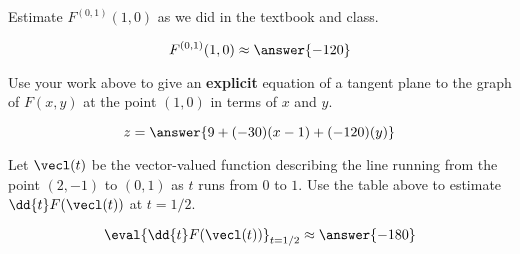 \documentclass{ximera}
\begin{document}
\begin{problem}
Estimate $F^{(0,1)}(1,0)$ as we did in the textbook and class.
\begin{prompt}
\[
  F^{(0,1)}(1,0) \approx \answer{-120}
\]
\end{prompt}

\vfill

\end{problem}


\begin{problem}
  Use your work above to give an \textbf{explicit} equation of a
  tangent plane to the graph of $F(x,y)$ at the point $(1,0)$ in terms
  of $x$ and $y$.
\begin{prompt}
\[
z = \answer{9 + (-30)(x - 1) + (-120)(y)}
\]
\end{prompt}

\vfill

\end{problem}


\begin{problem}
  Let $\vecl(t)$ be the vector-valued function describing the line
  running from the point $(2,-1)$ to $(0,1)$ as $t$ runs from $0$ to
  $1$.  Use the table above to estimate $\dd{t}F(\vecl(t))$ at $t = 1/2$.
  \begin{prompt}
  \[
  \eval{\dd{t} F(\vecl(t))}_{t=1/2} \approx \answer{-180}
  \]
  \end{prompt}

  \vfill
  
\end{problem}
\end{document}
